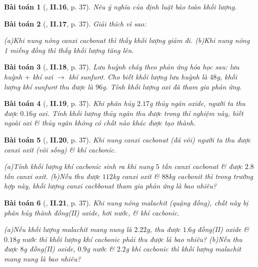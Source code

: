 \documentclass{article}
\numberwithin{equation}{section}
\newtheorem{baitoan}{Bài toán}
\begin{document}
\begin{baitoan}[\cite{Truong_BTNC_Hoa_Hoc_8_2022}, \textbf{II.16}, p. 37]
	Nêu ý nghĩa của định luật bảo toàn khối lượng.
\end{baitoan}

\begin{baitoan}[\cite{Truong_BTNC_Hoa_Hoc_8_2022}, \textbf{II.17}, p. 37]
	Giải thích vì sao:
	
		(a)Khi nung nóng canxi cacbonat \emph{} thì thấy khối lượng giảm đi.
		(b)Khi nung nóng 1 miếng đồng thì thấy khối lượng tăng lên.
	
\end{baitoan}

\begin{baitoan}[\cite{Truong_BTNC_Hoa_Hoc_8_2022}, \textbf{II.18}, p. 37]
	Lưu huỳnh cháy theo phản ứng hóa học sau: lưu huỳnh $+$ khí oxi $\to$ khí sunfurơ. Cho biết khối lượng lưu huỳnh là $48$\emph{g}, khối lượng khí sunfurơ thu được là $96$\emph{g}. Tính khối lượng oxi đã tham gia phản ứng.
\end{baitoan}

\begin{baitoan}[\cite{Truong_BTNC_Hoa_Hoc_8_2022}, \textbf{II.19}, p. 37]
	Khi phân hủy $2.17$\emph{g} thủy ngân oxide, người ta thu được $0.16$\emph{g} oxi. Tính khối lượng thủy ngân thu được trong thí nghiệm này, biết ngoài oxi \& thủy ngân không có chất nào khác được tạo thành.
\end{baitoan}

\begin{baitoan}[\cite{Truong_BTNC_Hoa_Hoc_8_2022}, \textbf{II.20}, p. 37]
	Khi nung canxi cacbonat (đá vôi) người ta thu được canxi oxit (vôi sống) \& khí cacbonic.
	
		(a)Tính khối lượng khí cacbonic sinh ra khi nung $5$ tấn canxi cacbonat \& được $2.8$ tấn canxi oxit.
		(b)Nếu thu được $112$\emph{kg} canxi oxit \& $88$\emph{kg} cacbonit thì trong trường hợp này, khối lượng canxi cacbbonat tham gia phản ứng là bao nhiêu?
	
\end{baitoan}

\begin{baitoan}[\cite{Truong_BTNC_Hoa_Hoc_8_2022}, \textbf{II.21}, p. 37]
	Khi nung nóng malachit (quặng đồng), chất này bị phân hủy thành đồng(II) oxide, hơi nước, \& khí cacbonic.
	
		(a)Nếu khối lượng malachit  mang nung là $2.22$\emph{g}, thu được $1.6$\emph{g} đồng(II) oxide \& $0.18$\emph{g} nước thì khối lượng khí cacbonic phải thu được là bao nhiêu?
		(b)Nếu thu được $8$\emph{g} đồng(II) oxide, $0.9$\emph{g} nước \& $2.2$\emph{g} khí cacbonic thì khối lượng malachit mang nung là bao nhiêu?
	
\end{baitoan}
\end{document}
